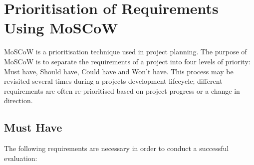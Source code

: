 \documentclass{l4proj}
\begin{document}
\section{Prioritisation of Requirements Using MoSCoW}

MoSCoW is a prioritisation technique used in project planning. The purpose of MoSCoW is to separate the requirements of a project into four levels of priority: Must have, Should have, Could have and Won't have. This process may be revisited several times during a projects development lifecycle; different requirements are often re-prioritised based on project progress or a change in direction.

\subsection*{Must Have}

The following requirements are necessary in order to conduct a successful evaluation:
\end{document}
